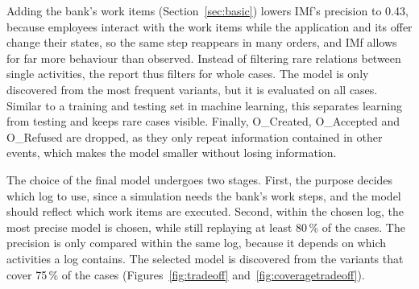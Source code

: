 \documentclass[
  english,        %
  font=times,     %
  twocolumn,      %
]{tumarticle}
\begin{document}
Adding the bank's work items (Section~\ref{sec:basic}) lowers IMf's precision to 0.43, because employees interact with the work items while the application and its offer change their states, so the same step reappears in many orders, and IMf allows for far more behaviour than observed. Instead of filtering rare relations between single activities, the report thus filters for whole cases. The model is only discovered from the most frequent variants, but it is evaluated on all cases. Similar to a training and testing set in machine learning, this separates
learning from testing and keeps rare cases visible. Finally, O\_Created, O\_Accepted and O\_Refused are dropped, as they only repeat information contained in other events, which makes the model smaller without losing information.

The choice of the final model undergoes two stages. First, the purpose decides which log to use, since a simulation needs the bank's work steps, and the model should reflect which work items are executed. Second, within the chosen log, the most precise model is chosen, while still replaying at least 80\,\% of the cases. The precision is only compared within the same log, because it depends on which activities a log contains. The selected model is discovered from the variants that cover 75\,\% of the cases (Figures~\ref{fig:tradeoff} and~\ref{fig:coveragetradeoff}).
\end{document}
